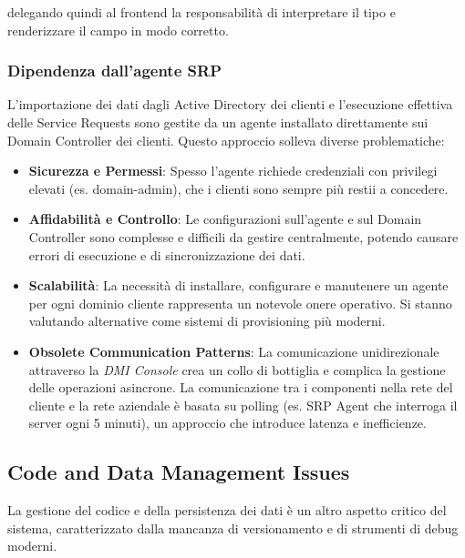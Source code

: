delegando quindi al frontend la responsabilità di interpretare il tipo e renderizzare il campo in modo corretto.

\subsubsection{Dipendenza dall'agente SRP}

L'importazione dei dati dagli Active Directory dei clienti e l'esecuzione effettiva delle Service Requests sono gestite da un agente installato direttamente sui Domain Controller dei clienti. Questo approccio solleva diverse problematiche:

\begin{itemize}
    \item \textbf{Sicurezza e Permessi}: Spesso l'agente richiede credenziali con privilegi elevati (es. domain-admin), che i clienti sono sempre più restii a concedere.
    \item \textbf{Affidabilità e Controllo}: Le configurazioni sull'agente e sul Domain Controller sono complesse e difficili da gestire centralmente, potendo causare errori di esecuzione e di sincronizzazione dei dati.
    \item \textbf{Scalabilità}: La necessità di installare, configurare e manutenere un agente per ogni dominio cliente rappresenta un notevole onere operativo. Si stanno valutando alternative come sistemi di provisioning più moderni.
    \item \textbf{Obsolete Communication Patterns}: La comunicazione unidirezionale attraverso la \textit{DMI Console} crea un collo di bottiglia e complica la gestione delle operazioni asincrone. La comunicazione tra i componenti nella rete del cliente e la rete aziendale è basata su polling (es. SRP Agent che interroga il server ogni 5 minuti), un approccio che introduce latenza e inefficienze.
\end{itemize}

\subsection{Code and Data Management Issues}

La gestione del codice e della persistenza dei dati è un altro aspetto critico del sistema, caratterizzato dalla mancanza di versionamento e di strumenti di debug moderni.

